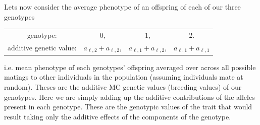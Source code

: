 

Lets now consider the average phenotype of an offspring of each of our
three genotypes
\begin{center}
\begin{tabular}{cccc}
genotype: & 0, & 1, & 2.\\
additive genetic value: & $a_{\ell,2}+ a_{\ell,2}$, & $a_{\ell,1}+a_{\ell,2}$, & $a_{\ell,1}+a_{\ell,1}$   \label{add_values}
\end{tabular}
\end{center}
%
i.e. mean phenotype of each genotypes' offspring
averaged over across all possible matings to other individuals in the
population (assuming individuals mate at random). Theses are the
additive MC genetic values (breeding values) of our genotypes. 
Here we are simply adding up the additive contributions of the alleles present
in each genotype. These are the genotypic values of the trait that would result
taking only the additive effects of the components of the genotype.  

